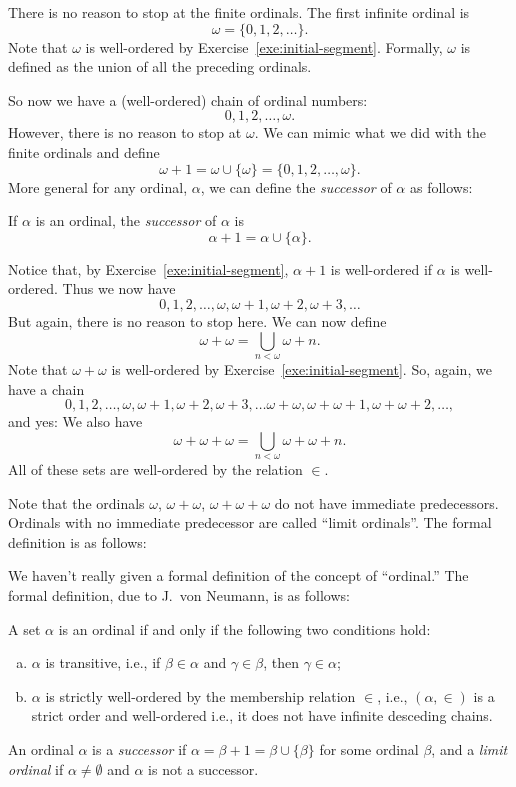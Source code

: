 There is no reason to stop at the finite ordinals.
The first infinite ordinal is
\[
  \omega=\{0, 1, 2, \dots\}.
\]
Note that $\omega$ is well-ordered by Exercise~\ref{exe:initial-segment}.
Formally, $\omega $ is defined as the union of all the preceding ordinals.

So now we have a (well-ordered) chain of ordinal numbers:
\[
  0, 1, 2, \dots,  \omega.
\]
However, there is no reason to stop at $\omega$.
We can mimic what we did with the finite ordinals and define
\[
  \omega+1=\omega\cup\{\omega\} =\{0, 1, 2, \dots,  \omega\}.
\]
More general for any ordinal, $\alpha$, we can define the \emph{successor} of $\alpha$ as follows:

\begin{definition}
  If $\alpha$ is an ordinal, the \emph{successor} of $\alpha$ is
  \[
    \alpha+1=\alpha\cup\{\alpha\}.
  \]
\end{definition}
Notice that, by Exercise~\ref{exe:initial-segment},  $\alpha+1$ is well-ordered if $\alpha$ is well-ordered.
Thus we now have
\[
  0, 1, 2, \dots,  \omega, \omega+1,\omega+2,\omega+3,\dots
\]
But again, there is no reason to stop here.
We can now define
\[
  \omega+\omega=\bigcup_{n<\omega} \omega+n.
\]
Note that $\omega+\omega$ is well-ordered by Exercise~\ref{exe:initial-segment}.
So, again, we have a chain
\[
  0, 1, 2, \dots,  \omega, \omega+1,\omega+2,\omega+3,\dots \omega+\omega, \omega+\omega+1,\omega+\omega+2,\dots,
\]
and yes:
We also have
\[
  \omega+\omega+\omega=\bigcup_{n<\omega} \omega+\omega+ n.
\]
All of these sets are well-ordered by the relation $\in$.

Note that the ordinals $\omega$, $\omega+\omega$, $\omega+\omega+\omega$  do not have immediate predecessors.
Ordinals with no immediate predecessor are called ``limit ordinals''.
The formal definition is as follows:




We haven’t really given a formal definition of the concept of “ordinal.” The formal definition, due to J.~von Neumann,  is as follows:

\begin{definition}
A set $\alpha$ is an ordinal if and only if the following two conditions hold:
\begin{enumerate}[(a)]
    \item $\alpha$ is transitive, i.e., if $\beta\in\alpha$ and $\gamma\in\beta$, then $\gamma\in\alpha$;
    \item $\alpha$ is strictly well-ordered by the membership relation $\in$, i.e., $(\alpha,\in)$ is a strict order and well-ordered i.e., it does not have infinite desceding chains.
\end{enumerate}
    An ordinal $\alpha$ is a \emph{successor} if $\alpha = \beta + 1 = \beta \cup \{\beta\}$ for some ordinal $\beta$, and a \emph{limit ordinal} if $\alpha \neq \emptyset$ and $\alpha$ is not a successor.
\end{definition}

